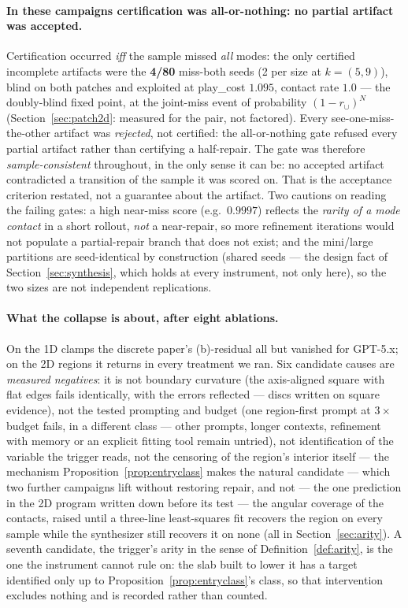 \documentclass[11pt]{article}
\theoremstyle{definition}
\theoremstyle{remark}
\begin{document}
\paragraph{In these campaigns certification was all-or-nothing: no partial artifact was accepted.} Certification occurred \emph{iff} the sample missed \emph{all} modes: the only certified incomplete artifacts were the \textbf{4/80} miss-both seeds (2 per size at $k = (5,9)$), blind on both patches and exploited at play\_cost $1.095$, contact rate $1.0$ --- the doubly-blind fixed point, at the joint-miss event of probability $(1-r_\cup)^N$ (Section~\ref{sec:patch2d}: measured for the pair, not factored). Every see-one-miss-the-other artifact was \emph{rejected}, not certified: the all-or-nothing gate refused every partial artifact rather than certifying a half-repair. The gate was therefore \emph{sample-consistent} throughout, in the only sense it can be: no accepted artifact contradicted a transition of the sample it was scored on. That is the acceptance criterion restated, not a guarantee about the artifact. Two cautions on reading the failing gates: a high near-miss score (e.g.\ $0.9997$) reflects the \emph{rarity of a mode contact} in a short rollout, \emph{not} a near-repair, so more refinement iterations would not populate a partial-repair branch that does not exist; and the mini/large partitions are seed-identical by construction (shared seeds --- the design fact of Section~\ref{sec:synthesis}, which holds at every instrument, not only here), so the two sizes are not independent replications.

\paragraph{What the collapse is about, after eight ablations.} On the 1D clamps the discrete paper's (b)-residual all but vanished for GPT-5.x; on the 2D regions it returns in every treatment we ran. Six candidate causes are \emph{measured negatives}: it is not boundary curvature (the axis-aligned square with flat edges fails identically, with the errors reflected --- discs written on square evidence), not the tested prompting and budget (one region-first prompt at $3\times$ budget fails, in a different class --- other prompts, longer contexts, refinement with memory or an explicit fitting tool remain untried), not identification of the variable the trigger reads, not the censoring of the region's interior itself --- the mechanism Proposition~\ref{prop:entryclass} makes the natural candidate --- which two further campaigns lift without restoring repair, and not --- the one prediction in the 2D program written down before its test --- the angular coverage of the contacts, raised until a three-line least-squares fit recovers the region on every sample while the synthesizer still recovers it on none (all in Section~\ref{sec:arity}). A seventh candidate, the trigger's arity in the sense of Definition~\ref{def:arity}, is the one the instrument cannot rule on: the slab built to lower it has a target identified only up to Proposition~\ref{prop:entryclass}'s class, so that intervention excludes nothing and is recorded rather than counted.
\end{document}
